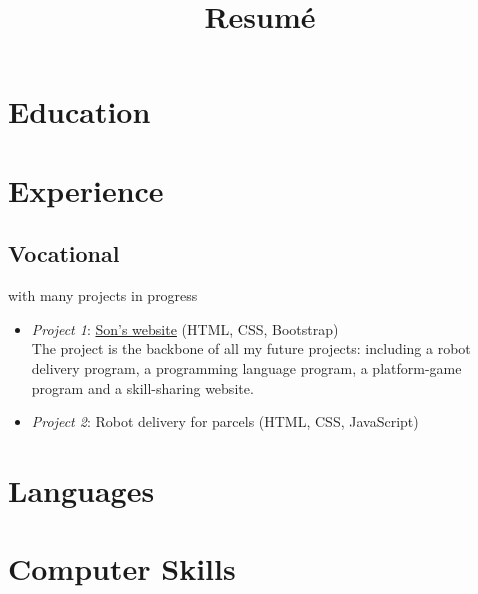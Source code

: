 \documentclass[11pt,a4paper,sans]{moderncv}
\title{Resumé}
\newcommand\Colorhref[3][cyan]{\href{#2}{\Large\color{#1}#3}}
\begin{document}
  \makecvtitle

  \section{Education}
  {}

  \section{Experience}
  \subsection{Vocational}
  {}
  {}
  {}
  {}
  {}
  {with many projects in progress}
  \begin{itemize}
    \item \emph{Project 1}: {\Colorhref[orange]{https://htmlpreview.github.io/?https://github.com/SonTrungTo/Full_Stack/blob/master/Bootstrap_Flexbox/project.html}%
    {Son's website}} (HTML, CSS, Bootstrap) \\
    The project is the backbone of all my future projects: including a robot delivery program,
    a programming language program, a platform-game program and a skill-sharing website.
    \item \emph{Project 2}: Robot delivery for parcels (HTML, CSS, JavaScript)
  \end{itemize}

  \section{Languages}

  \section{Computer Skills}
\end{document}
